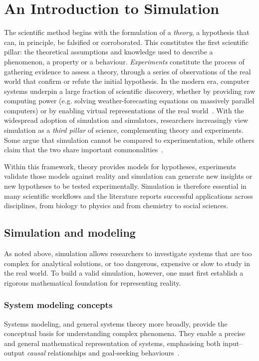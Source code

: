 \chapter{An Introduction to Simulation}\label{ch:introduction}
The scientific method begins with the formulation of a \emph{theory}, a
hypothesis that can, in principle, be falsified or corroborated. This
constitutes the first scientific pillar: the theoretical assumptions and
knowledge used to describe a phenomenon, a property or a behaviour.
\emph{Experiments} constitute the process of gathering evidence to assess a
theory, through a series of observations of the real world that confirm or
refute the initial hypothesis. In the modern era, computer systems
underpin a large fraction of scientific discovery, whether by providing raw
computing power (e.g. solving weather-forecasting equations on massively
parallel computers) or by enabling virtual representations of the real
world~\cite{Post2005-kn}. With the widespread adoption of simulation and
simulators, researchers increasingly view simulation as a \emph{third pillar}
of science, complementing theory and experiments. Some argue that simulation
cannot be compared to experimentation, while others claim that the two share
important commonalities~\cite{WinsbergEric2010Sita}.

Within this framework, theory provides models for hypotheses, experiments
validate those models against reality and simulation can generate new insights
or new hypotheses to be tested experimentally. Simulation is therefore essential in
many scientific workflows and the literature reports successful applications
across disciplines, from biology to physics and from chemistry to social
sciences.

\section{Simulation and modeling}
As noted above, simulation allows researchers to investigate systems that are
too complex for analytical solutions, or too dangerous, expensive or slow to
study in the real world. To build a valid simulation, however, one must
first establish a rigorous mathematical foundation for representing reality.

\subsection{System modeling concepts}

Systems modeling, and general systems theory more broadly, provide the
conceptual basis for understanding complex phenomena. They enable a precise and
general mathematical representation of systems, emphasising both input--output
\emph{causal} relationships and goal-seeking behaviours~\cite{mesarovic1975general}.

